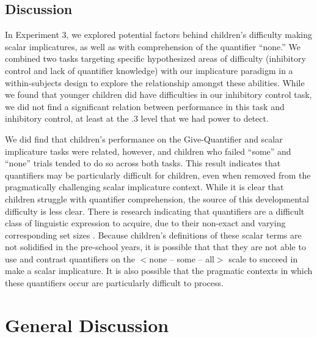 \documentclass[man]{apa2}
\begin{document}
{\subsection{Discussion}

In Experiment 3, we explored potential factors behind children's difficulty making scalar implicatures, as well as with comprehension of the quantifier ``none.'' We combined two tasks targeting specific hypothesized areas of difficulty (inhibitory control and lack of quantifier knowledge) with our implicature paradigm in a within-subjects design to explore the relationship amongst these abilities. While we found that younger children did have difficulties in our inhibitory control task, we did not find a significant relation between performance in this task and inhibitory control, at least at the .3 level that we had power to detect.

We did find that children's performance on the Give-Quantifier and scalar implicature tasks were related, however, and children who failed ``some'' and ``none'' trials tended to do so across both tasks. This result indicates that quantifiers may be particularly difficult for children, even when removed from the pragmatically challenging scalar implicature context. While it is clear that children struggle with quantifier comprehension, the source of this developmental difficulty is less clear. There is research indicating that quantifiers are a difficult class of linguistic expression to acquire, due to their non-exact and varying corresponding set sizes \cite{hurewitz2009}. Because children's definitions of these scalar terms are not solidified in the pre-school years, it is possible that that they are not able to use and contrast quantifiers on the $<${\sc none -- some -- all}$>$ scale to succeed in make a scalar implicature. It is also possible that the pragmatic contexts in which these quantifiers occur are particularly difficult to process.

\section{General Discussion}

}
\end{document}
